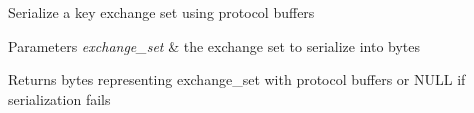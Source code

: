 Serialize a key exchange set using protocol buffers


\begin{DoxyParams}{Parameters}
{\em exchange\+\_\+set} & the exchange set to serialize into bytes \\
\hline
\end{DoxyParams}
\begin{DoxyReturn}{Returns}
bytes representing \textquotesingle{}exchange\+\_\+set\textquotesingle{} with protocol buffers or N\+U\+LL if serialization fails 
\end{DoxyReturn}
